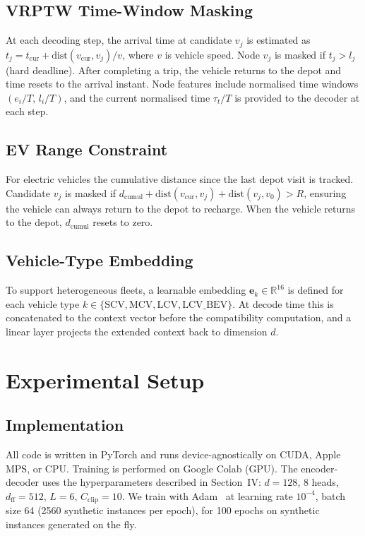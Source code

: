 \documentclass[conference]{IEEEtran}
\begin{document}
\subsection{VRPTW Time-Window Masking}

At each decoding step, the arrival time at candidate $v_j$ is estimated as
$t_j = t_{\text{cur}} + \text{dist}(v_{\text{cur}}, v_j) / v$, where $v$ is
vehicle speed. Node $v_j$ is masked if $t_j > l_j$ (hard deadline). After
completing a trip, the vehicle returns to the depot and time resets to the
arrival instant. Node features include normalised time windows
$(e_i/T,\, l_i/T)$, and the current normalised time $\tau_t/T$ is provided
to the decoder at each step.

\subsection{EV Range Constraint}

For electric vehicles the cumulative distance since the last depot visit is
tracked. Candidate $v_j$ is masked if
$d_{\text{cumul}} + \text{dist}(v_{\text{cur}},v_j) +
\text{dist}(v_j, v_0) > R$, ensuring the vehicle can always return to the
depot to recharge. When the vehicle returns to the depot, $d_{\text{cumul}}$
resets to zero.

\subsection{Vehicle-Type Embedding}

To support heterogeneous fleets, a learnable embedding
$\mathbf{e}_k \in \mathbb{R}^{16}$ is defined for each vehicle type
$k \in \{\text{SCV}, \text{MCV}, \text{LCV}, \text{LCV\_BEV}\}$.
At decode time this is concatenated to the context vector before the
compatibility computation, and a linear layer projects the extended context
back to dimension $d$.

\section{Experimental Setup}

\subsection{Implementation}

All code is written in PyTorch and runs device-agnostically on CUDA, Apple
MPS, or CPU. Training is performed on Google Colab (GPU). The encoder-decoder
uses the hyperparameters described in Section~IV: $d=128$, 8 heads,
$d_\text{ff}=512$, $L=6$, $C_\text{clip}=10$. We train with Adam~\cite{kingma2015adam}
at learning rate $10^{-4}$, batch size 64 (2560 synthetic instances per epoch),
for 100 epochs on synthetic instances generated on the fly.
\end{document}

